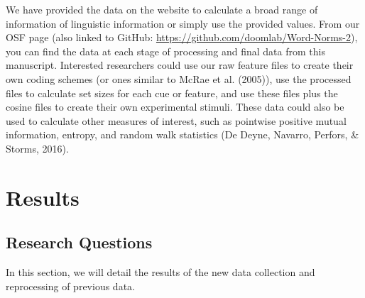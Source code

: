 \documentclass[english,,man]{apa6}
\begin{document}
We have provided the data on the website to calculate a broad range of information of linguistic information or simply use the provided values. From our OSF page (also linked to GitHub: \url{https://github.com/doomlab/Word-Norms-2}), you can find the data at each stage of processing and final data from this manuscript. Interested researchers could use our raw feature files to create their own coding schemes (or ones similar to McRae et al. (2005)), use the processed files to calculate set sizes for each cue or feature, and use these files plus the cosine files to create their own experimental stimuli. These data could also be used to calculate other measures of interest, such as pointwise positive mutual information, entropy, and random walk statistics (De Deyne, Navarro, Perfors, \& Storms, 2016).

\hypertarget{results}{%
\section{Results}\label{results}}

\hypertarget{research-questions}{%
\subsection{Research Questions}\label{research-questions}}

In this section, we will detail the results of the new data collection and reprocessing of previous data.
\end{document}
